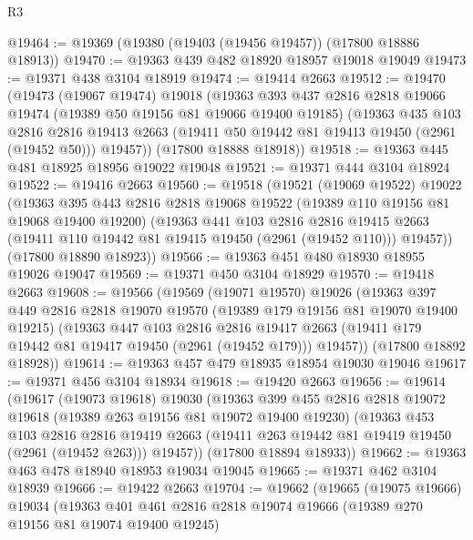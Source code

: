 \begin{lexlean}{R3}
\begin{coremodule}
@19464 := @19369 (@19380 (@19403 (@19456 @19457)) (@17800 @18886 @18913))
@19470 := @19363 @439 @482 @18920 @18957 @19018 @19049
@19473 := @19371 @438 @3104 @18919
@19474 := @19414 @2663
@19512 := @19470
    (@19473
      (@19067 @19474)
      @19018
      (@19363
        @393
        @437
        @2816
        @2818
        @19066
        @19474
        (@19389 @50 @19156 @81 @19066 @19400 @19185)
        (@19363
          @435
          @103
          @2816
          @2816
          @19413
          @2663
          (@19411 @50 @19442 @81 @19413 @19450 (@2961 (@19452 @50)))
          @19457))
      (@17800 @18888 @18918))
@19518 := @19363 @445 @481 @18925 @18956 @19022 @19048
@19521 := @19371 @444 @3104 @18924
@19522 := @19416 @2663
@19560 := @19518
    (@19521
      (@19069 @19522)
      @19022
      (@19363
        @395
        @443
        @2816
        @2818
        @19068
        @19522
        (@19389 @110 @19156 @81 @19068 @19400 @19200)
        (@19363
          @441
          @103
          @2816
          @2816
          @19415
          @2663
          (@19411 @110 @19442 @81 @19415 @19450 (@2961 (@19452 @110)))
          @19457))
      (@17800 @18890 @18923))
@19566 := @19363 @451 @480 @18930 @18955 @19026 @19047
@19569 := @19371 @450 @3104 @18929
@19570 := @19418 @2663
@19608 := @19566
    (@19569
      (@19071 @19570)
      @19026
      (@19363
        @397
        @449
        @2816
        @2818
        @19070
        @19570
        (@19389 @179 @19156 @81 @19070 @19400 @19215)
        (@19363
          @447
          @103
          @2816
          @2816
          @19417
          @2663
          (@19411 @179 @19442 @81 @19417 @19450 (@2961 (@19452 @179)))
          @19457))
      (@17800 @18892 @18928))
@19614 := @19363 @457 @479 @18935 @18954 @19030 @19046
@19617 := @19371 @456 @3104 @18934
@19618 := @19420 @2663
@19656 := @19614
    (@19617
      (@19073 @19618)
      @19030
      (@19363
        @399
        @455
        @2816
        @2818
        @19072
        @19618
        (@19389 @263 @19156 @81 @19072 @19400 @19230)
        (@19363
          @453
          @103
          @2816
          @2816
          @19419
          @2663
          (@19411 @263 @19442 @81 @19419 @19450 (@2961 (@19452 @263)))
          @19457))
      (@17800 @18894 @18933))
@19662 := @19363 @463 @478 @18940 @18953 @19034 @19045
@19665 := @19371 @462 @3104 @18939
@19666 := @19422 @2663
@19704 := @19662
    (@19665
      (@19075 @19666)
      @19034
      (@19363
        @401
        @461
        @2816
        @2818
        @19074
        @19666
        (@19389 @270 @19156 @81 @19074 @19400 @19245)

\end{coremodule}
\end{lexlean}
